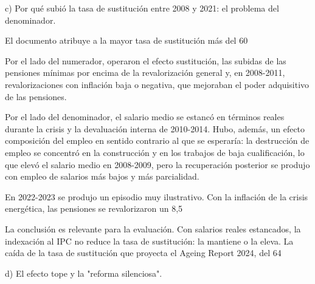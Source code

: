 \documentclass[10pt,a4paper]{article}
\begin{document}
c) Por qué subió la tasa de sustitución entre 2008 y 2021: el problema del denominador.

El documento atribuye a la mayor tasa de sustitución más del 60%

Por el lado del numerador, operaron el efecto sustitución, las subidas de las pensiones mínimas por encima de la revalorización general y, en 2008-2011, revalorizaciones con inflación baja o negativa, que mejoraban el poder adquisitivo de las pensiones.

Por el lado del denominador, el salario medio se estancó en términos reales durante la crisis y la devaluación interna de 2010-2014. Hubo, además, un efecto composición del empleo en sentido contrario al que se esperaría: la destrucción de empleo se concentró en la construcción y en los trabajos de baja cualificación, lo que elevó el salario medio en 2008-2009, pero la recuperación posterior se produjo con empleo de salarios más bajos y más parcialidad.

En 2022-2023 se produjo un episodio muy ilustrativo. Con la inflación de la crisis energética, las pensiones se revalorizaron un 8,5%

La conclusión es relevante para la evaluación. Con salarios reales estancados, la indexación al IPC no reduce la tasa de sustitución: la mantiene o la eleva. La caída de la tasa de sustitución que proyecta el Ageing Report 2024, del 64%

d) El efecto tope y la "reforma silenciosa".
\end{document}
